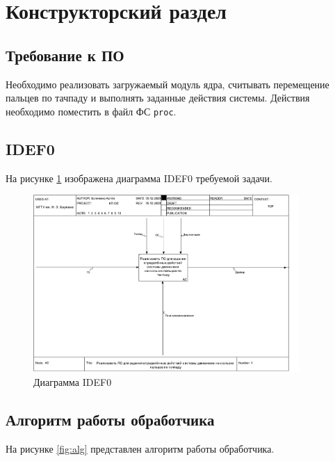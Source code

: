 \section{Конструкторский раздел}

\subsection{Требование к ПО}

Необходимо реализовать загружаемый модуль ядра, считывать перемещение пальцев по тачпаду и выполнять заданные действия системы. Действия необходимо поместить в файл ФС \texttt{proc}.

\subsection{IDEF0}

На рисунке \ref{fig:idef} изображена диаграмма IDEF0 требуемой задачи.

\begin{figure}[h!btp]
	\centering
	\includegraphics[width=0.9\textwidth]{inc/idef.pdf}
	\caption{Диаграмма IDEF0}
	\label{fig:idef}	
\end{figure}

\subsection{Алгоритм работы обработчика}

На рисунке \ref{fig:alg} представлен алгоритм работы обработчика.

